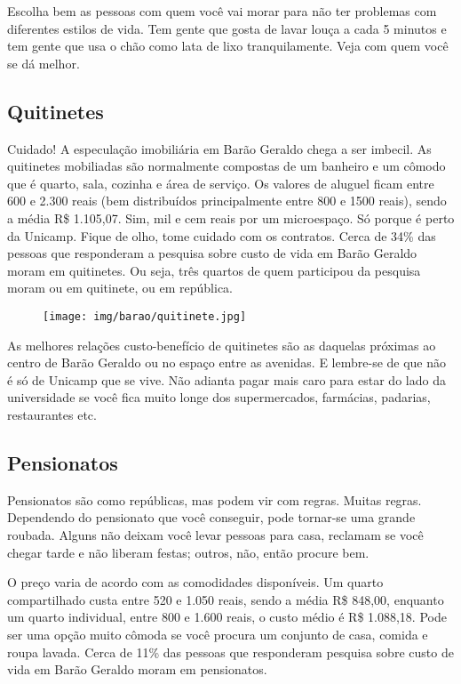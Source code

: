 Escolha bem as pessoas com quem você vai morar para não ter problemas com
diferentes estilos de vida. Tem gente que gosta de lavar louça a cada 5 minutos
e tem gente que usa o chão como lata de lixo tranquilamente. Veja com quem você
se dá melhor.

\subsection{Quitinetes}

Cuidado! A especulação imobiliária em Barão Geraldo chega a ser imbecil. As
quitinetes mobiliadas são normalmente compostas de um banheiro e um cômodo que
é quarto, sala, cozinha e área de serviço. Os valores de aluguel ficam entre
600 e 2.300 reais (bem distribuídos principalmente entre 800 e 1500 reais),
sendo a média R\$ 1.105,07. Sim, mil e cem reais por um microespaço. Só porque
é perto da Unicamp. Fique de olho, tome cuidado com os contratos. Cerca de 34\%
das pessoas que responderam a pesquisa sobre custo de vida em Barão Geraldo
moram em quitinetes. Ou seja, três quartos de quem participou da pesquisa moram
ou em quitinete, ou em república.

\begin{figure}[h!]
  \centering
  \texttt{[image: img/barao/quitinete.jpg]}
\end{figure}

As melhores relações custo-benefício de quitinetes são as daquelas próximas ao
centro de Barão Geraldo ou no espaço entre as avenidas. E lembre-se de que não
é só de Unicamp que se vive. Não adianta pagar mais caro para estar do lado da
universidade se você fica muito longe dos supermercados, farmácias, padarias,
restaurantes etc.

\subsection{Pensionatos}

Pensionatos são como repúblicas, mas podem vir com regras. Muitas regras.
Dependendo do pensionato que você conseguir, pode tornar-se uma grande roubada.
Alguns não deixam você levar pessoas para casa, reclamam se você chegar tarde e
não liberam festas; outros, não, então procure bem.

O preço varia de acordo com as comodidades disponíveis. Um quarto compartilhado
custa entre 520 e 1.050 reais, sendo a média R\$ 848,00, enquanto um quarto
individual, entre 800 e 1.600 reais, o custo médio é R\$ 1.088,18. Pode ser uma
opção muito cômoda se você procura um conjunto de casa, comida e roupa lavada.
Cerca de 11\% das pessoas que responderam pesquisa sobre custo de vida em Barão
Geraldo moram em pensionatos.

